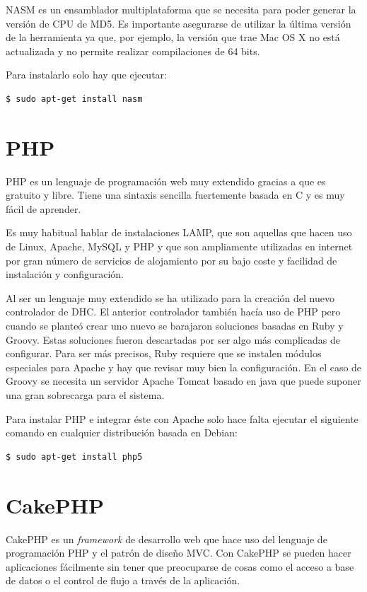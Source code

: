 NASM es un ensamblador multiplataforma que se necesita para poder generar la versión de CPU de MD5. Es importante asegurarse de utilizar la última versión de la herramienta ya que, por ejemplo, la versión que trae Mac OS X no está actualizada y no permite realizar compilaciones de 64 bits.

Para instalarlo solo hay que ejecutar:

\begin{verbatim}
$ sudo apt-get install nasm
\end{verbatim}

\section{PHP}

PHP es un lenguaje de programación web muy extendido gracias a que es gratuito y libre. Tiene una sintaxis sencilla fuertemente basada en C y es muy fácil de aprender.

Es muy habitual hablar de instalaciones LAMP, que son aquellas que hacen uso de Linux, Apache, MySQL y PHP y que son ampliamente utilizadas en internet por gran número de servicios de alojamiento por su bajo coste y facilidad de instalación y configuración.

Al ser un lenguaje muy extendido se ha utilizado para la creación del nuevo controlador de DHC. El anterior controlador también hacía uso de PHP pero cuando se planteó crear uno nuevo se barajaron soluciones basadas en Ruby y Groovy. Estas soluciones fueron descartadas por ser algo más complicadas de configurar. Para ser más precisos, Ruby requiere que se instalen módulos especiales para Apache y hay que revisar muy bien la configuración. En el caso de Groovy se necesita un servidor Apache Tomcat basado en java que puede suponer una gran sobrecarga para el sistema.

Para instalar PHP e integrar éste con Apache solo hace falta ejecutar el siguiente comando en cualquier distribución basada en Debian:

\begin{verbatim}
$ sudo apt-get install php5
\end{verbatim}

\section{CakePHP}

CakePHP es un \emph{framework} de desarrollo web que hace uso del lenguaje de programación PHP y el patrón de diseño MVC. Con CakePHP se pueden hacer aplicaciones fácilmente sin tener que preocuparse de cosas como el acceso a base de datos o el control de flujo a través de la aplicación.

